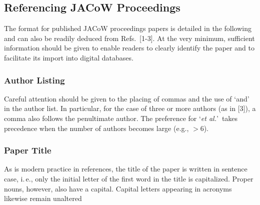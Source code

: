 \subsection{Referencing JACoW Proceedings}

The format for published JACoW proceedings papers is detailed in the following 
and can also be readily deduced from Refs.~[1-3]. At the very minimum, sufficient 
information should be given to enable readers to clearly identify the paper and 
to facilitate its import into digital databases.
\vspace*{-.6\baselineskip}

\subsubsection{Author Listing} Careful attention should be given to the
placing of commas and the use of ‘and’ in the author list.
In particular, for the case of three or more authors
(as in [3]), a comma also follows the penultimate author.
The preference for ‘\emph{et al.}’\ takes precedence when the number
of authors becomes large (e.g., $>$6).
\vspace*{-.6\baselineskip}

\subsubsection{Paper Title} As is modern practice in references, the title
of the paper is written in sentence case, i.\,e., only the
initial letter of the first word in the title is capitalized.
Proper nouns, however, also have a capital. Capital letters
appearing in acronyms likewise remain unaltered
\vspace*{-.6\baselineskip}

